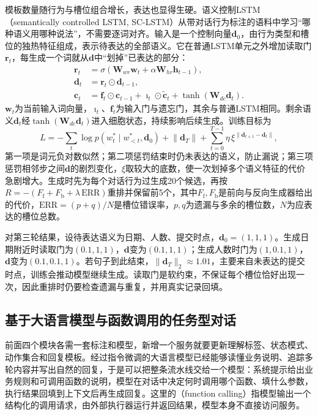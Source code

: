 模板数量随行为与槽位组合增长，表达也显得生硬。语义控制LSTM（semantically controlled LSTM, SC-LSTM）从带对话行为标注的语料中学习“哪种语义用哪种说法”，不需要逐词对齐。输入是一个控制向量$\bm{d}_0$，由行为类型和槽位的独热特征组成，表示待表达的全部语义。它在普通LSTM单元之外增加读取门$\bm{r}_t$，每生成一个词就从$\bm{d}$中“划掉”已表达的部分：
\begin{equation}
\begin{aligned}
 \bm{r}_t&=\sigma(\bm{W}_{wr}\bm{w}_t+
                   \alpha\bm{W}_{hr}\bm{h}_{t-1}),\\
 \bm{d}_t&=\bm{r}_t\odot\bm{d}_{t-1},\\
 \bm{c}_t&=\bm{f}_t\odot\bm{c}_{t-1}
       +\bm{\imath}_t\odot\widetilde{\bm{c}}_t
       +\tanh(\bm{W}_{dc}\bm{d}_t).
\end{aligned}
\label{eq:nlp-dialogue-sclstm}
\end{equation}
$\bm{w}_t$为当前输入词向量，$\bm{\imath}_t$、$\bm{f}_t$为输入门与遗忘门，其余与普通LSTM相同。剩余语义$\bm{d}_t$经$\tanh(\bm{W}_{dc}\bm{d}_t)$进入细胞状态，持续影响后续生成。训练目标为
\begin{equation}
 L=-\sum_{t}\log p(w_t^*\mid w_{<t}^*,\bm{d}_0)+\lVert\bm{d}_T\rVert+\sum_{t=0}^{T-1}\eta\,\xi^{\lVert\bm{d}_{t+1}-\bm{d}_t\rVert},
 \label{eq:nlp-dialogue-sclstm-loss}
\end{equation}
第一项是词元负对数似然；第二项惩罚结束时仍未表达的语义，防止漏说；第三项惩罚相邻步之间$\bm{d}$的剧烈变化，$\xi$取较大的底数，使一次划掉多个语义特征的代价急剧增大。生成时先为每个对话行为过生成20个候选，再按$R=-(F_{\mathrm f}+F_{\mathrm b}+\lambda\,\mathrm{ERR})$重排并保留前5个，其中$F_{\mathrm f},F_{\mathrm b}$是前向与反向生成器给出的代价，$\mathrm{ERR}=(p+q)/N$是槽位错误率，$p,q$为遗漏与多余的槽位数，$N$为应表达的槽位总数。

对第三轮结果，设待表达语义为日期、人数、提交时点，$\bm{d}_0=(1,1,1)$。生成日期附近时读取门为$(0.1,1,1)$，$\bm{d}$变为$(0.1,1,1)$；生成人数时门为$(1,0.1,1)$，$\bm{d}$变为$(0.1,0.1,1)$。若句子到此结束，$\lVert\bm{d}_T\rVert_2\approx1.01$，主要来自未表达的提交时点，训练会推动模型继续生成。读取门是软约束，不保证每个槽位恰好出现一次，因此重排时仍要检查遗漏与重复，并用真实记录回填。

\subsection{基于大语言模型与函数调用的任务型对话}
\label{sec:nlp-dialogue-llm-function}

前面四个模块各需一套标注和模型，新增一个服务就要更新理解标签、状态模式、动作集合和回复模板。经过指令微调的大语言模型已经能够读懂业务说明、追踪多轮内容并写出自然的回复，于是可以把整条流水线交给一个模型：系统提示给出业务规则和可调用函数的说明，模型在对话中决定何时调用哪个函数、填什么参数，执行结果回填到上下文后再生成回复。这里的（function calling）指模型输出一个结构化的调用请求，由外部执行器运行并返回结果，模型本身不直接访问服务。


